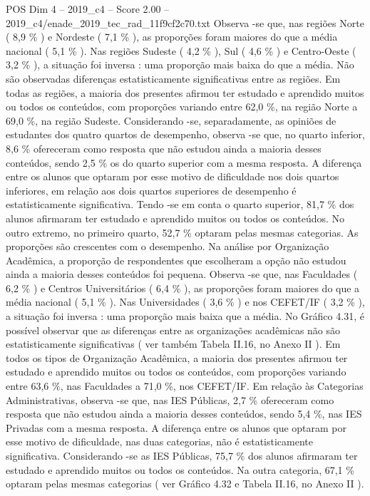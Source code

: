 \begin{textsample}{POS Dim 4 – 2019\_c4 – Score 2.00 – 2019\_c4/enade\_2019\_tec\_rad\_11f9cf2c70.txt}
Observa -se que, nas regiões Norte ( 8,9 \% ) e Nordeste ( 7,1 \% ), as proporções foram maiores do que a média nacional ( 5,1 \% ).
Nas regiões Sudeste ( 4,2 \% ), Sul ( 4,6 \% ) e Centro-Oeste ( 3,2 \% ), a situação foi inversa : uma proporção mais baixa do que a média.
Não são observadas diferenças estatisticamente significativas entre as regiões.
Em todas as regiões, a maioria dos presentes afirmou ter estudado e aprendido muitos ou todos os conteúdos, com proporções variando entre 62,0 \%, na região Norte a 69,0 \%, na região Sudeste.
Considerando -se, separadamente, as opiniões de estudantes dos quatro quartos de desempenho, observa -se que, no quarto inferior, 8,6 \% ofereceram como resposta que não estudou ainda a maioria desses conteúdos, sendo 2,5 \% os do quarto superior com a mesma resposta.
A diferença entre os alunos que optaram por esse motivo de dificuldade nos dois quartos inferiores, em relação aos dois quartos superiores de desempenho é estatisticamente significativa.
Tendo -se em conta o quarto superior, 81,7 \% dos alunos afirmaram ter estudado e aprendido muitos ou todos os conteúdos.
No outro extremo, no primeiro quarto, 52,7 \% optaram pelas mesmas categorias.
As proporções são crescentes com o desempenho.
Na análise por Organização Acadêmica, a proporção de respondentes que escolheram a opção não estudou ainda a maioria desses conteúdos foi pequena.
Observa -se que, nas Faculdades ( 6,2 \% ) e Centros Universitários ( 6,4 \% ), as proporções foram maiores do que a média nacional ( 5,1 \% ).
Nas Universidades ( 3,6 \% ) e nos CEFET/IF ( 3,2 \% ), a situação foi inversa : uma proporção mais baixa que a média.
No Gráfico 4.31, é possível observar que as diferenças entre as organizações acadêmicas não são estatisticamente significativas ( ver também Tabela II.16, no Anexo II ).
Em todos os tipos de Organização Acadêmica, a maioria dos presentes afirmou ter estudado e aprendido muitos ou todos os conteúdos, com proporções variando entre 63,6 \%, nas Faculdades a 71,0 \%, nos CEFET/IF.
Em relação às Categorias Administrativas, observa -se que, nas IES Públicas, 2,7 \% ofereceram como resposta que não estudou ainda a maioria desses conteúdos, sendo 5,4 \%, nas IES Privadas com a mesma resposta.
A diferença entre os alunos que optaram por esse motivo de dificuldade, nas duas categorias, não é estatisticamente significativa.
Considerando -se as IES Públicas, 75,7 \% dos alunos afirmaram ter estudado e aprendido muitos ou todos os conteúdos.
Na outra categoria, 67,1 \% optaram pelas mesmas categorias ( ver Gráfico 4.32 e Tabela II.16, no Anexo II ).

\end{textsample}
